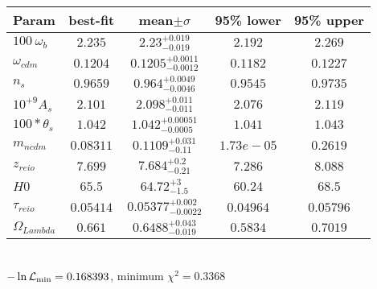 \begin{tabular}{|l|c|c|c|c|} 
 \hline 
Param & best-fit & mean$\pm\sigma$ & 95\% lower & 95\% upper \\ \hline 
$100~\omega{}_{b }$ &$2.235$ & $2.23_{-0.019}^{+0.019}$ & $2.192$ & $2.269$ \\ 
$\omega{}_{cdm }$ &$0.1204$ & $0.1205_{-0.0012}^{+0.0011}$ & $0.1182$ & $0.1227$ \\ 
$n_{s }$ &$0.9659$ & $0.964_{-0.0046}^{+0.0049}$ & $0.9545$ & $0.9735$ \\ 
$10^{+9}A_{s }$ &$2.101$ & $2.098_{-0.011}^{+0.011}$ & $2.076$ & $2.119$ \\ 
$100*\theta{}_{s }$ &$1.042$ & $1.042_{-0.0005}^{+0.00051}$ & $1.041$ & $1.043$ \\ 
$m_{ncdm }$ &$0.08311$ & $0.1109_{-0.11}^{+0.031}$ & $1.73e-05$ & $0.2619$ \\ 
$z_{reio }$ &$7.699$ & $7.684_{-0.21}^{+0.2}$ & $7.286$ & $8.088$ \\ 
$H0$ &$65.5$ & $64.72_{-1.5}^{+3}$ & $60.24$ & $68.5$ \\ 
$\tau{}_{reio }$ &$0.05414$ & $0.05377_{-0.0022}^{+0.002}$ & $0.04964$ & $0.05796$ \\ 
$\Omega{}_{Lambda }$ &$0.661$ & $0.6488_{-0.019}^{+0.043}$ & $0.5834$ & $0.7019$ \\ 
\hline 
 \end{tabular} \\ 
$-\ln{\cal L}_\mathrm{min} =0.168393$, minimum $\chi^2=0.3368$ \\ 
